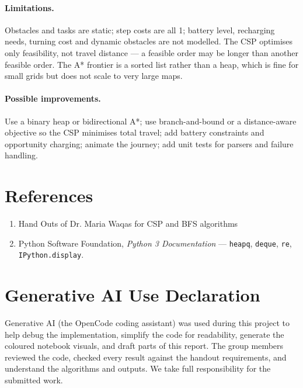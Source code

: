 \documentclass[11pt,a4paper]{article}
\newcommand{\code}[1]{\texttt{#1}}
\begin{document}
\paragraph{Limitations.} Obstacles and tasks are static; step costs are all 1; battery level,
recharging needs, turning cost and dynamic obstacles are not modelled. The CSP optimises only
feasibility, not travel distance --- a feasible order may be longer than another feasible order.
The A* frontier is a sorted list rather than a heap, which is fine for small grids but does not
scale to very large maps.

\paragraph{Possible improvements.} Use a binary heap or bidirectional A*; use branch-and-bound
or a distance-aware objective so the CSP minimises total travel; add battery constraints and
opportunity charging; animate the journey; add unit tests for parsers and failure handling.

\section{References}

\begin{enumerate}[leftmargin=1.2cm]
  \item Hand Outs of Dr. Maria Waqas for CSP and BFS algorithms
  \item Python Software Foundation, \emph{Python 3 Documentation} --- \code{heapq},
        \code{deque}, \code{re}, \code{IPython.display}.
\end{enumerate}

\section{Generative AI Use Declaration}

Generative AI (the OpenCode coding assistant) was used during this project to help debug the
implementation, simplify the code for readability, generate the coloured notebook visuals, and
draft parts of this report. The group members reviewed the code, checked every result against
the handout requirements, and understand the algorithms and outputs. We take full
responsibility for the submitted work.
\end{document}
